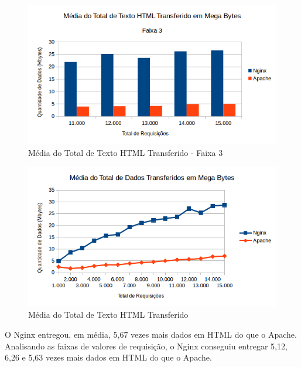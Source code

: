 \begin{figure}[H]
	\centering
	\includegraphics[width=1\linewidth]{graficos/grafico3-f3} 
	\caption{Média do Total de Texto HTML Transferido - Faixa 3}
	\label{fig:grafico3-f3}
\end{figure}
\begin{figure}[H]
	\centering
	\includegraphics[width=1\linewidth]{graficos/grafico3} 
	\caption{Média do Total de Texto HTML Transferido}
	\label{fig:grafico3}
\end{figure}
O Nginx entregou, em média, 5,67 vezes mais dados em HTML do que o Apache. 
Analisando as faixas de valores de requisição, o Nginx conseguiu entregar 5,12, 
6,26 e 5,63 vezes mais dados em HTML do que o Apache.
